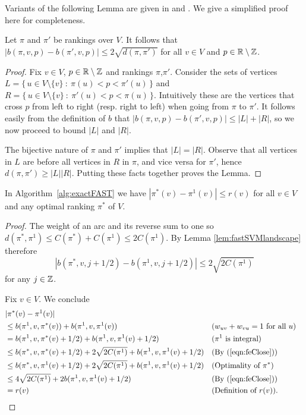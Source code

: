 \documentclass[envcountsame,oribibl]{llncs}
\newcommand{\set}[1]{\{#1\}}                        \newcommand{\setof}[2]{\{\,{#1}\::\:{#2}\,\}}        \newcommand{\groupFrac}[2]{\left(\frac{#1}{#2}\right)}
\newcommand{\sm}{\setminus} \newcommand{\compl}[1]{\overline{#1}}                \newcommand{\floor}[1]{\left\lfloor #1 \right\rfloor}
\begin{document}
Variants of the following Lemma are given in \cite{Mathieu09fast} and \cite{Karpinski09betweenness}. We give a simplified proof here for completeness.

\begin{lemma}\label{lem:fastSVMlandscape}
Let $\pi$ and $\pi'$ be rankings over $V$. It follows that $|b(\pi, v, p) - b(\pi', v, p)| \le 2 \sqrt{d(\pi,\pi')}$ for all $v \in V$ and $p \in \R \sm \Z$.
\end{lemma}

\begin{proof}
Fix $v \in V$, $p \in \R \sm \Z$ and rankings $\pi$,$\pi'$. 
Consider the sets of vertices $L=\setof{u \in V \sm \set{v}}{\pi(u)<p<\pi'(u)}$ and $R=\setof{u \in V \sm \set{v}}{\pi'(u)<p<\pi(u)}$. Intuitively these are the vertices that cross $p$ from left to right (resp. right to left) when going from $\pi$ to $\pi'$. It follows easily from the definition of $b$ that $|b(\pi, v, p) - b(\pi', v, p)| \le |L|+|R|$, so we now proceed to bound $|L|$ and $|R|$.

The bijective nature of $\pi$ and $\pi'$ implies that $|L|=|R|$. Observe that all vertices in $L$ are before all vertices in $R$ in $\pi$, and vice versa for $\pi'$, hence $d(\pi,\pi') \ge |L||R|$. Putting these facts together proves the Lemma.
\end{proof}

\begin{lemma}\label{lem:feClose}
In Algorithm~\ref{alg:exactFAST} we have  $|\pi^*(v) - \pi^1(v)| \le r(v)$ for all $v \in V$ and any optimal ranking $\pi^*$ of $V$.
\end{lemma}
\begin{proof}
The weight of an arc and its reverse sum to one so $d(\pi^*, \pi^1) \le C(\pi^*) + C(\pi^1) \le 2C(\pi^1)$. By Lemma \ref{lem:fastSVMlandscape} therefore 
\begin{equation}
|b(\pi^*, v, j + 1/2) - b(\pi^1, v, j +1/2)| \le 2\sqrt{2C(\pi^1)} \label{eqn:feClose}
\end{equation}
for any $j \in \mathbb{Z}$.

Fix $v \in V$. We conclude
\begin{align*}
\lefteqn{|\pi^*(v) - \pi^1(v)|} \\
&\le b(\pi^1, v, \pi^*(v)) + b(\pi^1, v, \pi^1(v)) && \text{($w_{uv}+w_{vu}=1$ for all $u$)}\\
 &=  b(\pi^1, v, \pi^*(v) + 1/2) + b(\pi^1, v, \pi^1(v) + 1/2) && \text{($\pi^1$ is integral)}\\
 &\le b(\pi^*, v, \pi^*(v) + 1/2) + 2 \sqrt{2C(\pi^1)} + b(\pi^1, v, \pi^1(v) + 1/2)&& \text{(By (\ref{eqn:feClose}))} \\
 &\le b(\pi^*, v, \pi^1(v) + 1/2) + 2 \sqrt{2C(\pi^1)} + b(\pi^1, v, \pi^1(v) + 1/2) && \text{(Optimality of }\pi^*\text{)} \\
&\le 4 \sqrt{2C(\pi^1)} + 2b(\pi^1, v, \pi^1(v) + 1/2) && \text{(By (\ref{eqn:feClose}))} \\
& = r(v) && \text{(Definition of $r(v)$)}
.\end{align*}
\end{proof}
\end{document}
